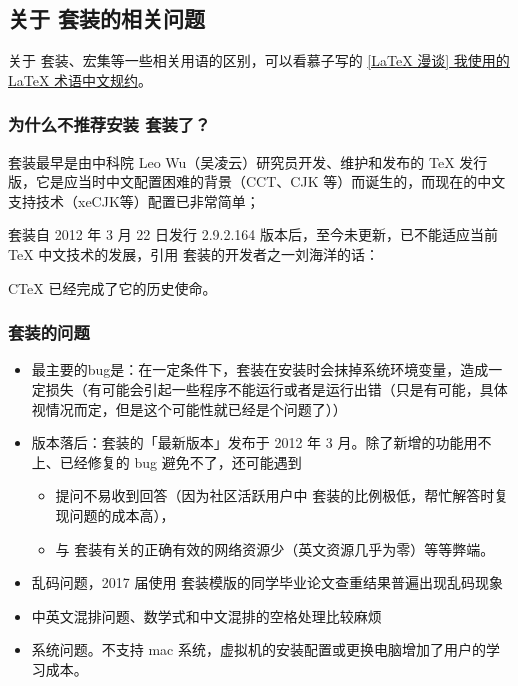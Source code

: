 
\subsection{关于 \CTeX 套装的相关问题}

关于 \CTeX 套装、\CTeX 宏集等一些相关用语的区别，可以看慕子写的 \href{https://zhuanlan.zhihu.com/p/45350320}{[LaTeX 漫谈] 我使用的 LaTeX 术语中文规约}。

\subsubsection{为什么不推荐安装 \CTeX 套装了？}

\CTeX 套装最早是由中科院 Leo Wu（吴凌云）研究员开发、维护和发布的 \TeX{} 发行版，它是应当时中文配置困难的背景（CCT、CJK 等）而诞生的，而现在的中文支持技术（xeCJK等）配置已非常简单；

\CTeX 套装自 2012 年 3 月 22 日发行 2.9.2.164 版本后，至今未更新，已不能适应当前 TeX 中文技术的发展，引用 \CTeX 套装的开发者之一刘海洋的话：
\begin{latexexample}
  CTeX 已经完成了它的历史使命。
\end{latexexample}


\subsubsection{\CTeX 套装的问题}

\begin{itemize}
  \item 最主要的bug是：在一定条件下，\CTeX 套装在安装时会抹掉系统环境变量，造成一定损失（有可能会引起一些程序不能运行或者是运行出错（只是有可能，具体视情况而定，但是这个可能性就已经是个问题了））
  \item 版本落后：\CTeX 套装的「最新版本」发布于 2012 年 3 月。除了新增的功能用不上、已经修复的 bug 避免不了，还可能遇到
    \begin{itemize}
      \item 提问不易收到回答（因为社区活跃用户中 \CTeX 套装的比例极低，帮忙解答时复现问题的成本高），
      \item 与 \CTeX 套装有关的正确有效的网络资源少（英文资源几乎为零）等等弊端。
    \end{itemize}
  \item 乱码问题，2017 届使用 \CTeX 套装模版的同学毕业论文查重结果普遍出现乱码现象
  \item 中英文混排问题、数学式和中文混排的空格处理比较麻烦
  \item 系统问题。不支持 mac 系统，虚拟机的安装配置或更换电脑增加了用户的学习成本。
\end{itemize}


